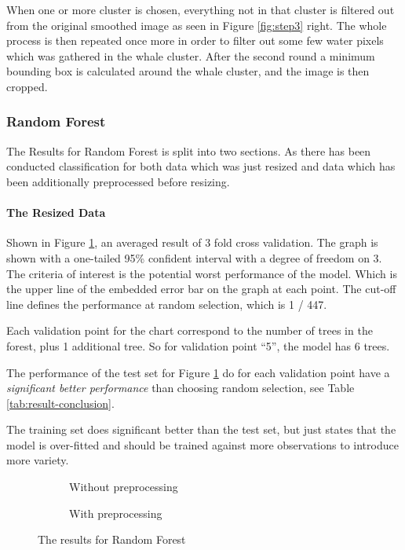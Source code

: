 When one or more cluster is chosen, everything not in that cluster is filtered out from the original smoothed image as seen in Figure \ref{fig:step3} right. The whole process is then repeated once more in order to filter out some few water pixels which was gathered in the whale cluster.
After the second round a minimum bounding box is calculated around the whale cluster, and the image is then cropped.



\subsubsection{Random Forest}
The Results for Random Forest is split into two sections. As there has been conducted classification for both data which was just resized and data which has been additionally preprocessed before resizing.

\paragraph{The Resized Data}
\label{par:rf-resized}
Shown in Figure \ref{fig:random-forest-resized}, an averaged result of 3 fold cross validation. The graph is shown with a one-tailed 95\% confident interval with a degree of freedom on 3. The criteria of interest is the potential worst performance of the model. Which is the upper line of the embedded error bar on the graph at each point. The cut-off line defines the performance at random selection, which is 1 / 447. 

Each validation point for the chart correspond to the number of trees in the forest, plus 1 additional tree. So for validation point ``5'', the model has 6 trees.

The performance of the test set for Figure \ref{fig:random-forest-resized} do for each validation point have a \emph{significant better performance} than choosing random selection, see Table \ref{tab:result-conclusion}.

The training set does significant better than the test set, but just states that the model is over-fitted and should be trained against more observations to introduce more variety.

\begin{figure*}
  \centering
    \begin{subfigure}{.5\linewidth}
      \centering
      \caption{Without preprocessing}
      \label{fig:random-forest-resized}
    \end{subfigure}%
    \begin{subfigure}{.5\linewidth}
      \centering
      \caption{With preprocessing}
      \label{fig:random-forest-preprocessed}
    \end{subfigure}
  \caption{The results for Random Forest}
  \label{fig:random-forest}
\end{figure*}

